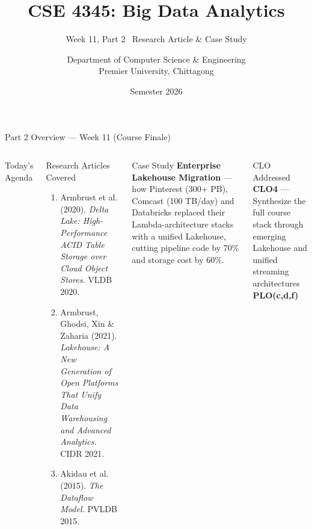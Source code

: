 \documentclass[aspectratio=169,10pt]{beamer}
\title[CSE 4345 \textbar{} Week 11, Part 2]{CSE 4345: Big Data Analytics}
\subtitle{Week 11, Part 2 \textemdash\ Research Article \& Case Study}
\author[Dept.\ of CSE]{Department of Computer Science \& Engineering\\[4pt]
       \small Premier University, Chittagong}
\institute{}
\date{Semester 2026}
\begin{document}

\begin{frame}
  \titlepage
\end{frame}

\begin{frame}{Part 2 Overview — Week 11 (Course Finale)}
  \begin{columns}[T]
      \begin{block}{Today's Agenda}
        \tableofcontents
      \end{block}
      \begin{exampleblock}{Research Articles Covered}
        \begin{enumerate}
          \item Armbrust et al. (2020).
                \textit{Delta Lake: High-Performance ACID Table
                Storage over Cloud Object Stores.} VLDB 2020.
          \item Armbrust, Ghodsi, Xin \& Zaharia (2021).
                \textit{Lakehouse: A New Generation of Open Platforms
                That Unify Data Warehousing and Advanced Analytics.}
                CIDR 2021.
          \item Akidau et al. (2015).
                \textit{The Dataflow Model.} PVLDB 2015.
        \end{enumerate}
      \end{exampleblock}
      \vspace{5pt}
      \begin{alertblock}{Case Study}
        \textbf{Enterprise Lakehouse Migration} — how Pinterest
        (300+ PB), Comcast (100 TB/day) and Databricks replaced
        their Lambda-architecture stacks with a unified Lakehouse,
        cutting pipeline code by 70\% and storage cost by 60\%.
      \end{alertblock}
      \vspace{4pt}
      \begin{block}{CLO Addressed}
        \textbf{CLO4} — Synthesize the full course stack through
        emerging Lakehouse and unified streaming architectures\\
        \textbf{PLO(c,d,f)}
      \end{block}
  \end{columns}
\end{frame}

\end{document}

